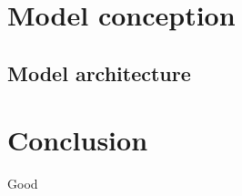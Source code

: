 \documentclass[paper=a4, fontsize=11pt]{scrartcl}
\begin{document}

\newpage


\newpage

\renewcommand{\contentsname}{Table of contents}
\tableofcontents
\newpage

\listoffigures

\listoftables



\newpage


\newpage


\newpage

\section{Model conception}

\subsection{Model architecture}

\newpage

\section{Conclusion}
Good
\newpage

\printbibliography[heading=bibintoc, title={Bibliography}]
\newpage


\end{document}
